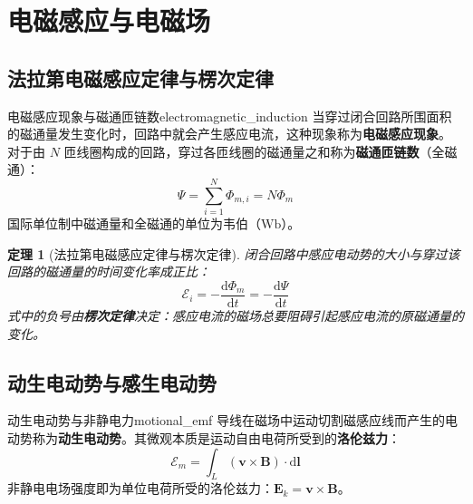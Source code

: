 \documentclass[11pt,a4paper,fontset=fandol]{ctexart}
\newtheorem{theorem}{定理}[section]
\theoremstyle{remark}
\begin{document}
\newpage

\section{电磁感应与电磁场}

\subsection{法拉第电磁感应定律与楞次定律}

\begin{definition}{电磁感应现象与磁通匝链数}{electromagnetic_induction}
当穿过闭合回路所围面积的磁通量发生变化时，回路中就会产生感应电流，这种现象称为\textbf{电磁感应现象}。
对于由 $N$ 匝线圈构成的回路，穿过各匝线圈的磁通量之和称为\textbf{磁通匝链数}（全磁通）：
\begin{equation}
    \Psi = \sum_{i=1}^{N} \Phi_{m,i} = N \Phi_m
\end{equation}
国际单位制中磁通量和全磁通的单位为韦伯（$\mathrm{Wb}$）。
\end{definition}

\begin{theorem}[法拉第电磁感应定律与楞次定律]
闭合回路中感应电动势的大小与穿过该回路的磁通量的时间变化率成正比：
\begin{equation}
    \mathcal{E}_i = -\frac{\mathrm{d}\Phi_m}{\mathrm{d}t} = -\frac{\mathrm{d}\Psi}{\mathrm{d}t}
\end{equation}
式中的负号由\textbf{楞次定律}决定：感应电流的磁场总要阻碍引起感应电流的原磁通量的变化。
\end{theorem}

\subsection{动生电动势与感生电动势}

\begin{definition}{动生电动势与非静电力}{motional_emf}
导线在磁场中运动切割磁感应线而产生的电动势称为\textbf{动生电动势}。其微观本质是运动自由电荷所受到的\textbf{洛伦兹力}：
\begin{equation}
    \mathcal{E}_m = \int_{L} (\bm{v} \times \bm{B}) \cdot \mathrm{d}\bm{l}
\end{equation}
非静电电场强度即为单位电荷所受的洛伦兹力：$\bm{E}_k = \bm{v} \times \bm{B}$。
\end{definition}
\end{document}
